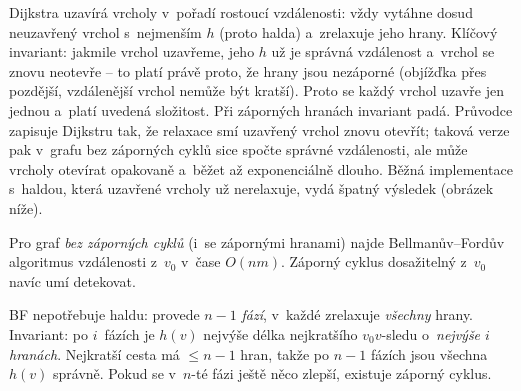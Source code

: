 \documentclass[11pt,a4paper]{article}
\begin{document}
\begin{intuice}
Dijkstra uzavírá vrcholy v~pořadí rostoucí vzdálenosti: vždy vytáhne dosud neuzavřený vrchol s~nejmenším $h$ (proto halda) a~zrelaxuje jeho hrany. Klíčový invariant: jakmile vrchol uzavřeme, jeho $h$ už je správná vzdálenost a~vrchol se znovu neotevře -- to platí právě proto, že hrany jsou nezáporné (objížďka přes pozdější, vzdálenější vrchol nemůže být kratší). Proto se každý vrchol uzavře jen jednou a~platí uvedená složitost. Při záporných hranách invariant padá. Průvodce zapisuje Dijkstru tak, že relaxace smí uzavřený vrchol znovu otevřít; taková verze pak v~grafu bez záporných cyklů sice spočte správné vzdálenosti, ale může vrcholy otevírat opakovaně a~běžet až exponenciálně dlouho. Běžná implementace s~haldou, která uzavřené vrcholy už nerelaxuje, vydá špatný výsledek (obrázek níže).
\end{intuice}

\begin{veta}
Pro graf \emph{bez záporných cyklů} (i~se zápornými hranami) najde Bellmanův--Fordův algoritmus vzdálenosti z~$v_0$ v~čase $O(nm)$. Záporný cyklus dosažitelný z~$v_0$ navíc umí detekovat.
\end{veta}

\begin{intuice}
BF nepotřebuje haldu: provede $n-1$ \emph{fází}, v~každé zrelaxuje \emph{všechny} hrany. Invariant: po $i$~fázích je $h(v)$ nejvýše délka nejkratšího $v_0v$-sledu o~\emph{nejvýše $i$ hranách}. Nejkratší cesta má $\le n-1$ hran, takže po $n-1$ fázích jsou všechna $h(v)$ správně. Pokud se v~$n$-té fázi ještě něco zlepší, existuje záporný cyklus.
\end{intuice}

\begin{center}
\end{center}
\end{document}
